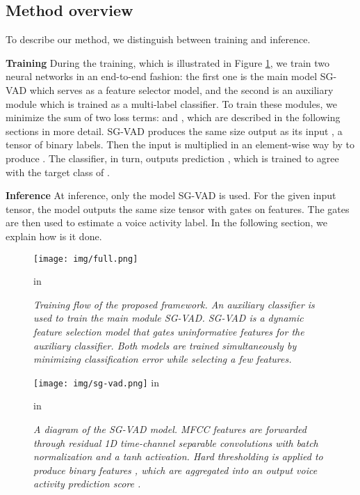 \documentclass{article}
\begin{document}
\subsection{Method overview}

To describe our method, we distinguish between training and inference. 

\textbf{Training} \hspace{5pt} During the training, which is illustrated in Figure \ref{fig:train}, we train two neural networks in an end-to-end fashion: the first one is the main model SG-VAD which serves as a feature selector model, and the second is an auxiliary module which is trained as a multi-label classifier. To train these modules, we minimize the sum of two loss terms:  and , which are described in the following sections in more detail. SG-VAD produces the same size output  as its input , a tensor of binary labels. Then the input  is multiplied in an element-wise way by  to produce . The classifier, in turn, outputs prediction , which is trained to agree with the target class of .

\textbf{Inference} \hspace{5pt} At inference, only the model SG-VAD is used. For the given input tensor, the model outputs the same size tensor with gates on features. The gates are then used to estimate a voice activity label. In the following section, we explain how is it done.

\begin{figure}
  \centering
    \texttt{[image: img/full.png]}
    \caption{\textit{Training flow of the proposed framework. An auxiliary classifier is used to train the main module SG-VAD. SG-VAD is a dynamic feature selection model that gates uninformative features for the auxiliary classifier. Both models are trained simultaneously by minimizing classification error while selecting a few features. }}
    \label{fig:train}
          in
\end{figure}

\begin{figure}[t]
  \centering
    \texttt{[image: img/sg-vad.png]}
     in
    \caption{\textit{A diagram of the SG-VAD model. MFCC features are forwarded through residual 1D time-channel separable convolutions with batch normalization and a tanh activation. Hard thresholding is applied to produce binary features , which are aggregated into an output voice activity prediction score .}}
    \label{fig:proposed}
      in
\end{figure}
\end{document}
